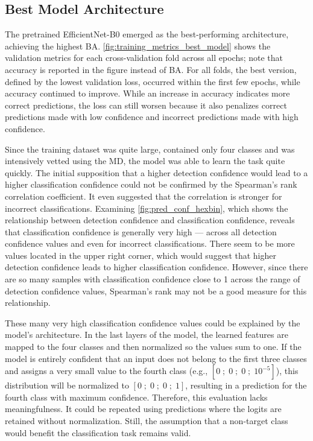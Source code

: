 \subsection{Best Model Architecture}
The pretrained EfficientNet-B0 emerged as the best-performing architecture, achieving the highest \ac{BA}.
\autoref{fig:training_metrics_best_model} shows the validation metrics for each cross-validation fold across all epochs; note that accuracy is reported in the figure instead of \ac{BA}.
For all folds, the best version, defined by the lowest validation loss, occurred within the first few epochs, while accuracy continued to improve.
While an increase in accuracy indicates more correct predictions, the loss can still worsen because it also penalizes correct predictions made with low confidence and incorrect predictions made with high confidence.

Since the training dataset was quite large, contained only four classes and was intensively vetted using the \ac{MD}, the model was able to learn the task quite quickly.
The initial supposition that a higher detection confidence would lead to a higher classification confidence could not be confirmed by the Spearman's rank correlation coefficient.
It even suggested that the correlation is stronger for incorrect classifications.
Examining \autoref{fig:pred_conf_hexbin}, which shows the relationship between detection confidence and classification confidence, reveals that classification confidence is generally very high — across all detection confidence values and even for incorrect classifications.
There seem to be more values located in the upper right corner, which would suggest that higher detection confidence leads to higher classification confidence.
However, since there are so many samples with classification confidence close to 1 across the range of detection confidence values, Spearman's rank may not be a good measure for this relationship.

These many very high classification confidence values could be explained by the model's architecture.
In the last layers of the model, the learned features are mapped to the four classes and then normalized so the values sum to one.
If the model is entirely confident that an input does not belong to the first three classes and assigns a very small value to the fourth class (e.g., \([0\;;\;0\;;\;0\;;\;10^{-5}]\)), this distribution will be normalized to \([0\;;\;0\;;\;0\;;\;1]\), resulting in a prediction for the fourth class with maximum confidence.
Therefore, this evaluation lacks meaningfulness.
It could be repeated using predictions where the logits are retained without normalization.
Still, the assumption that a non-target class would benefit the classification task remains valid.


